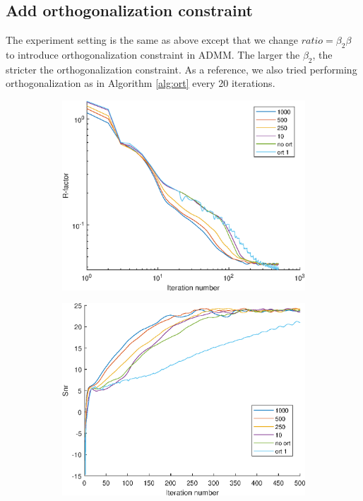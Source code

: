 \documentclass{article}
\numberwithin{equation}{section}
\begin{document}
\subsection{Add orthogonalization constraint}
The experiment setting is the same as above except that we change $ratio=\beta_2\beta$ to introduce orthogonalization constraint in ADMM. The larger the $\beta_2$, the stricter the orthogonalization constraint. As a reference, we also tried performing orthogonalization as in Algorithm \ref{alg:ort} every 20 iterations. 
\begin{figure}
 \begin{subfigure}{.33\textwidth}
   \centering
   \includegraphics[width=1\linewidth]{figures/ort_R.eps}  
   \label{fig:ort_R}
 \end{subfigure}
 \begin{subfigure}{.3\textwidth}
   \centering
   \includegraphics[width=1\linewidth]{figures/ort_snr.eps}  

\end{subfigure}
\end{figure}
\end{document}

